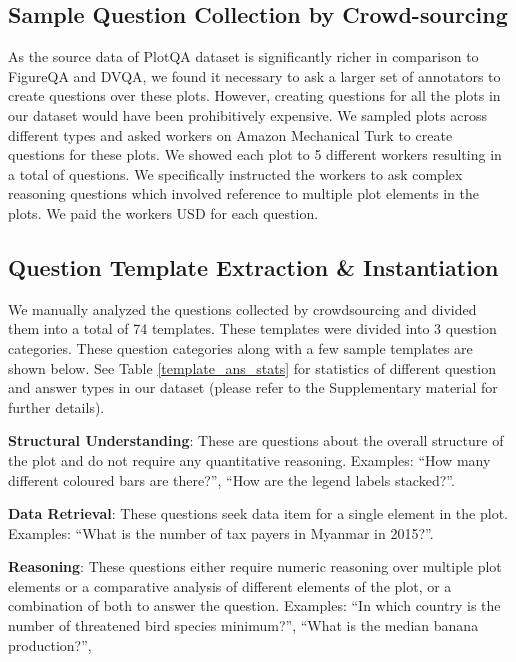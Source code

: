 \documentclass[10pt,twocolumn,letterpaper]{article}
\begin{document}
\subsection{Sample Question Collection by Crowd-sourcing}
As the source data of PlotQA dataset is significantly richer in comparison to FigureQA and DVQA, we found it necessary to ask a larger set of annotators to create questions over these plots. 
However, creating questions for all the plots in our dataset would have been prohibitively expensive. 
We sampled  plots across different types and asked workers on Amazon Mechanical Turk to create questions for these plots. 
We showed each plot to 5 different workers resulting in a total of  questions. 
We specifically instructed the workers to ask complex reasoning questions which involved reference to multiple plot elements in the plots. 
We paid the workers USD  for each question.




\subsection{Question Template Extraction \& Instantiation}

We manually analyzed the questions collected by crowdsourcing and divided them into a total of 74 templates. These templates were divided into 3 question categories. 
These question categories along with a few sample templates are shown below. See Table \ref{template_ans_stats} for statistics of different question and answer types in our dataset (please refer to the Supplementary material for further details).

\noindent\textbf{Structural Understanding}: 
    These are questions about the overall structure of the plot and do not require any quantitative reasoning. 
    Examples: ``How many different coloured bars are there?'', ``How are the legend labels stacked?''.

\noindent\textbf{Data Retrieval}:
    These questions seek data item for a single element in the plot.
    Examples: ``What is the number of tax payers in Myanmar in 2015?''.

\noindent\textbf{Reasoning}: 
    These questions either require numeric reasoning over multiple plot elements or a comparative analysis of different elements of the plot, or a combination of both to answer the question. 
    Examples: 
``In which country is the number of threatened bird species minimum?'', 
    ``What is the median banana production?'', 
\end{document}
